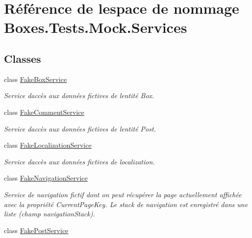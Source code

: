 \hypertarget{namespace_boxes_1_1_tests_1_1_mock_1_1_services}{}\section{Référence de l\textquotesingle{}espace de nommage Boxes.\+Tests.\+Mock.\+Services}
\label{namespace_boxes_1_1_tests_1_1_mock_1_1_services}
\subsection*{Classes}
\begin{DoxyCompactItemize}
\item 
class \hyperlink{class_boxes_1_1_tests_1_1_mock_1_1_services_1_1_fake_box_service}{Fake\+Box\+Service}
\begin{DoxyCompactList}\small\item\em Service d\textquotesingle{}accès aux données fictives de l\textquotesingle{}entité Box. \end{DoxyCompactList}\item 
class \hyperlink{class_boxes_1_1_tests_1_1_mock_1_1_services_1_1_fake_comment_service}{Fake\+Comment\+Service}
\begin{DoxyCompactList}\small\item\em Service d\textquotesingle{}accès aux données fictives de l\textquotesingle{}entité Post. \end{DoxyCompactList}\item 
class \hyperlink{class_boxes_1_1_tests_1_1_mock_1_1_services_1_1_fake_localization_service}{Fake\+Localization\+Service}
\begin{DoxyCompactList}\small\item\em Service d\textquotesingle{}accès aux données fictives de localization. \end{DoxyCompactList}\item 
class \hyperlink{class_boxes_1_1_tests_1_1_mock_1_1_services_1_1_fake_navigation_service}{Fake\+Navigation\+Service}
\begin{DoxyCompactList}\small\item\em Service de navigation fictif dont on peut récupérer la page actuellement affichée avec la propriété {\ttfamily Current\+Page\+Key}. Le stack de navigation est enregistré dans une liste (champ {\ttfamily navigation\+Stack}). \end{DoxyCompactList}\item 
class \hyperlink{class_boxes_1_1_tests_1_1_mock_1_1_services_1_1_fake_post_service}{Fake\+Post\+Service}

\end{DoxyCompactItemize}
